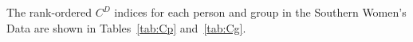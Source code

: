 \documentclass[a4paper,fleqn]{cas-sc}
\begin{document}
The rank-ordered $C^D$ indices for each person and group in the Southern Women's Data are shown in Tables~\ref{tab:Cp} and~\ref{tab:Cg}.





% 



\end{document}
